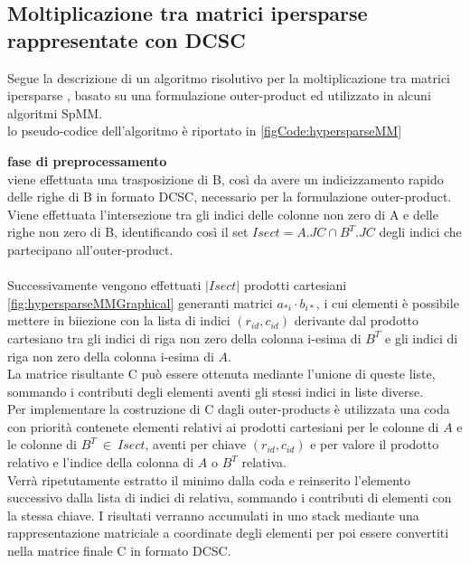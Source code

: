 \subsection{Moltiplicazione tra matrici ipersparse rappresentate con DCSC}
\label{ssec:hypersparseMM}
Segue la descrizione di un algoritmo risolutivo per la moltiplicazione tra matrici
ipersparse \cite{2dNewIdeas}, basato su una formulazione outer-product ed
utilizzato in alcuni algoritmi SpMM.\\
lo pseudo-codice dell'algoritmo è riportato in \ref{figCode:hypersparseMM} 


{\bf fase di preprocessamento} \\
viene effettuata una trasposizione di B, così da avere un indicizzamento rapido delle righe di B
in formato DCSC, necessario per la
formulazione outer-product.\\ 
Viene effettuata l'intersezione tra gli indici delle colonne non zero di A e
delle righe non zero di B, identificando così il set $Isect = A.JC \cap B^T.JC$ degli
indici che partecipano all'outer-product.\\
\\
Successivamente vengono effettuati $|Isect|$ prodotti cartesiani \ref{fig:hypersparseMMGraphical} 
generanti matrici $a_{*i} \cdot b_{i*}$, i cui elementi è possibile mettere in biiezione 
con la lista di indici $(r_{id},c_{id})$ derivante dal prodotto cartesiano tra gli indici
di riga non zero della colonna i-esima di $B^T$ e gli indici di riga non zero 
della colonna i-esima di $A$.\\
La matrice risultante C può essere ottenuta mediante l'unione di queste liste,
sommando i contributi degli elementi aventi gli stessi indici in liste
diverse.\\
Per implementare la costruzione di C dagli outer-products
è utilizzata una coda con priorità contenete elementi relativi ai
prodotti cartesiani per le colonne di $A$ e le colonne di $B^T ~\in~ Isect$, 
aventi per chiave $(r_{id},c_{id})$ e per valore il prodotto relativo e l'indice
della colonna di $A$ o $B^T$ relativa.\\
Verrà ripetutamente estratto il minimo dalla coda e reinserito
l'elemento successivo dalla lista di indici di relativa, sommando i
contributi di elementi con la stessa chiave.
I risultati verranno accumulati in uno stack mediante una rappresentazione
matriciale a coordinate degli elementi %
per poi essere convertiti nella matrice finale C in formato DCSC.\\

